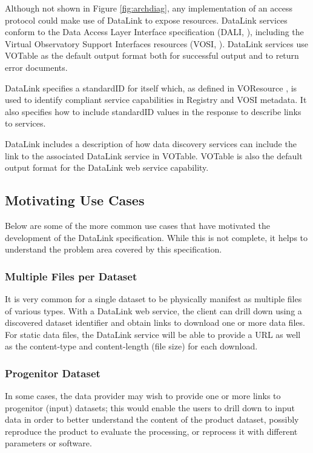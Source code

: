 \documentclass[11pt,a4paper]{ivoa}
\begin{document}
Although not shown in Figure \ref{fig:archdiag},
any implementation of an access protocol could
make use of DataLink to expose resources. DataLink services conform to
the Data Access Layer Interface specification
(DALI, \citet{2017ivoa.spec.0517D}),
including the
Virtual Observatory Support Interfaces resources
(VOSI, \citet{2017ivoa.spec.0524G}).
DataLink services use VOTable \citep{2019ivoa.spec.1021O}
as the default output format both for successful
output and to return error documents.

DataLink specifies a standardID for itself which, as defined in VOResource
\citep{2018ivoa.spec.0625P}, is used to identify compliant service
capabilities in Registry and VOSI metadata.
It also specifies how to
include standardID values in the response to describe links to services.

DataLink includes a description of how data discovery services can include
the link to the associated DataLink service in VOTable. VOTable is
also the default output format for the DataLink web service capability.


\subsection{Motivating Use Cases}

Below are some of the more common use cases that have motivated the
development of the DataLink specification. While this is not complete,
it helps to understand the problem area covered by this specification.


\subsubsection{Multiple Files per Dataset}
\label{sec:useMultiFile}

It is very common for a single dataset to be physically manifest as
multiple files of various types. With a DataLink web service, the client
can drill down using a discovered dataset identifier and obtain links to
download one or more data files.  For static data files, the DataLink
service will be able to provide a URL as well as the content-type and
content-length (file size) for each download.


\subsubsection{Progenitor Dataset}

In some cases, the data provider may wish to provide one or more links to
progenitor (input) datasets; this would enable the users to drill down
to input data in order to better understand the content of the product
dataset, possibly reproduce the product to evaluate the processing,
or reprocess it with different parameters or software.
\end{document}
